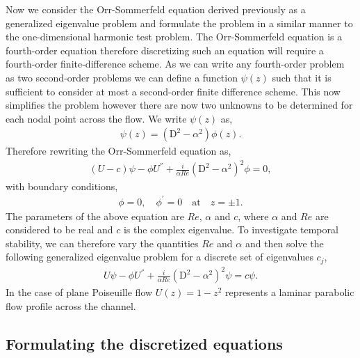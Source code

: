 \documentclass[a4paper, 12pt, twoside, openright]{article}
\numberwithin{equation}{section}
\begin{document}
Now we consider the Orr-Sommerfeld equation derived previously as a generalized eigenvalue problem and formulate the problem in a similar manner to the one-dimensional harmonic test problem. The Orr-Sommerfeld equation is a fourth-order equation therefore discretizing such an equation will require a fourth-order finite-difference scheme. As we can write any fourth-order problem as two second-order problems we can define a function $\psi(z)$ such that it is sufficient to consider at most a second-order finite difference scheme. This now simplifies the problem however there are now two unknowns to be determined for each nodal point across the flow. We write $\psi(z)$ as,
\begin{align}
\psi(z) = (\mathrm{D}^2-\alpha^2)\phi(z).
\end{align}
Therefore rewriting the Orr-Sommerfeld equation as,
\begin{align}
(U-c)\psi - \phi U^{''} + \frac{i}{\alpha Re}(\mathrm{D}^2-\alpha^2)^2\phi = 0,
\end{align}
with boundary conditions,
\begin{align}
\phi=0, \quad \phi^{\prime}=0 \quad \text{at} \quad z=\pm1.
\end{align}
The parameters of the above equation are $Re$, $\alpha$ and $c$, where $\alpha$ and $Re$ are considered to be real and $c$ is the complex eigenvalue. To investigate temporal stability, we can therefore vary the quantities $Re$ and $\alpha$ and then solve the following generalized eigenvalue problem for a discrete set of eigenvalues $c_j$,
\begin{align}
U\psi - \phi U^{''} + \frac{i}{\alpha Re}(\mathrm{D}^2-\alpha^2)^2\psi = c\psi . 
\end{align}
In the case of plane Poiseuille flow $U(z) = 1 - z^2$ represents a laminar parabolic flow profile across the channel.

\subsection{Formulating the discretized equations} 
\end{document}
